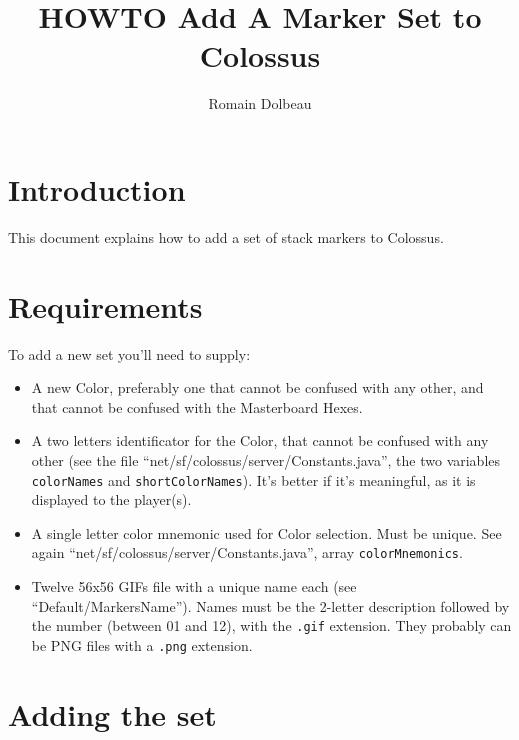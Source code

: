 \documentclass{article}
\begin{document}

\title{HOWTO Add A Marker Set to Colossus}

\author{Romain Dolbeau}

\maketitle

\section{Introduction}

This document explains how to add a set of stack markers to Colossus.

\section{Requirements}

To add a new set you'll need to supply:

\begin{itemize}

\item A new Color, preferably one that cannot be confused with any other, and that cannot be confused with the Masterboard Hexes.

\item A two letters identificator for the Color, that cannot be confused with any other (see the file ``net/sf/colossus/server/Constants.java'', the two variables \texttt{colorNames} and \texttt{shortColorNames}). It's better if it's meaningful, as it is displayed to the player(s).

\item A single letter color mnemonic used for Color selection. Must be unique. See again ``net/sf/colossus/server/Constants.java'', array \texttt{colorMnemonics}.

\item Twelve 56x56 GIFs file with a unique name each (see ``Default/MarkersName''). Names must be the 2-letter description followed by the number (between 01 and 12), with the \texttt{.gif} extension. They probably can be PNG files with a \texttt{.png} extension.

\end{itemize}

\section{Adding the set}
\end{document}
